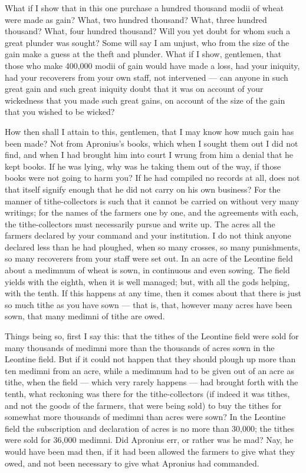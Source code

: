  What if I show that in this one purchase a hundred thousand modii of wheat were made as gain? What, two hundred thousand? What, three hundred thousand? What, four hundred thousand? Will you yet doubt for whom such a great plunder was sought? Some will say I am unjust, who from the size of the gain make a guess at the theft and plunder. What if I show, gentlemen, that those who make 400,000 modii of gain would have made a loss, had your iniquity, had your recoverers from your own staff, not intervened --- can anyone in such great gain and such great iniquity doubt that it was on account of your wickedness that you made such great gains, on account of the size of the gain that you wished to be wicked?

 How then shall I attain to this, gentlemen, that I may know how much gain has been made? Not from Apronius's books, which when I sought them out I did not find, and when I had brought him into court I wrung from him a denial that he kept books. If he was lying, why was he taking them out of the way, if those books were not going to harm you? If he had compiled no records at all, does not that itself signify enough that he did not carry on his own business? For the manner of tithe-collectors is such that it cannot be carried on without very many writings; for the names of the farmers one by one, and the agreements with each, the tithe-collectors must necessarily pursue and write up. The acres all the farmers declared by your command and your institution. I do not think anyone declared less than he had ploughed, when so many crosses, so many punishments, so many recoverers from your staff were set out. In an acre of the Leontine field about a medimnum of wheat is sown, in continuous and even sowing. The field yields with the eighth, when it is well managed; but, with all the gods helping, with the tenth. If this happens at any time, then it comes about that there is just so much tithe as you have sown --- that is, that, however many acres have been sown, that many medimni of tithe are owed.

 Things being so, first I say this: that the tithes of the Leontine field were sold for many thousands of medimni more than the thousands of acres sown in the Leontine field. But if it could not happen that they should plough up more than ten medimni from an acre, while a medimnum had to be given out of an acre as tithe, when the field --- which very rarely happens --- had brought forth with the tenth, what reckoning was there for the tithe-collectors (if indeed it was tithes, and not the goods of the farmers, that were being sold) to buy the tithes for somewhat more thousands of medimni than acres were sown? In the Leontine field the subscription and declaration of acres is no more than 30,000; the tithes were sold for 36,000 medimni. Did Apronius err, or rather was he mad? Nay, he would have been mad then, if it had been allowed the farmers to give what they owed, and not been necessary to give what Apronius had commanded.

